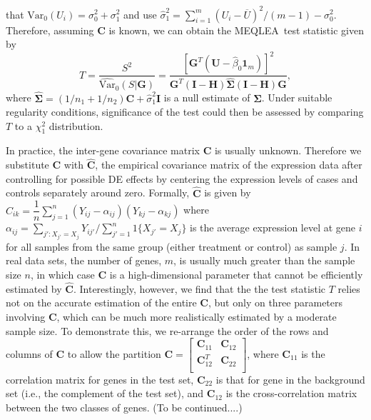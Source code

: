 \documentclass[a4,center,fleqn]{NAR}
\newcommand{\OurMethod}{MEQLEA}
\begin{document}
	that $\mbox{Var}_{0}(U_i)=\sigma_0^2+\sigma_1^2$ and use
	$\hat\sigma_1^2=\sum_{i=1}^m(U_i-\overline{U})^2/(m-1)-\sigma_0^2$. Therefore, assuming $\bm C$ is
	known, we can obtain the \OurMethod~test statistic given by
	\begin{equation}
	T = \dfrac{S^2}{\widehat{\mbox{Var}}_{0}(S|\bm G)} = \dfrac{[\bm G^T(\bm U-\hat\beta_0\bm
		1_m)]^2}{\bm G^T(\bm I-\bm H)\hat{\bm\Sigma}(\bm I-\bm H)\bm G}, 
	\end{equation}
	where $\hat{\bm\Sigma}=(1/n_1+1/n_2)\bm C+\hat\sigma_1^2\bm I$ is a null estimate of $\bm \Sigma$.
	Under suitable regularity conditions, significance of the test could then be assessed by comparing
	$T$ to a $\chi^2_1$ distribution.
	
	In practice, the inter-gene covariance matrix $\bm C$ is usually unknown. Therefore we 
	substitute $\bm C$
	with $\hat {\bm C}$, the empirical covariance matrix of the expression data after controlling for
	possible DE effects by centering the expression levels of cases and controls separately around
	zero. Formally, $\hat {\bm C}$ is given by $\hat
	C_{ik}=\dfrac{1}{n}\sum_{j=1}^n(Y_{ij}-\alpha_{ij})(Y_{kj}-\alpha_{kj})$ where
	$\alpha_{ij}=\sum_{j':X_{j'}=X_{j}}Y_{ij'}/\sum_{j'=1}^n1\{X_{j'}=X_{j}\}$ is the average expression
	level at gene $i$ for all samples from the same group (either treatment or control) as sample $j$.
	In real data sets, the number of genes, $m$, is usually much greater than the sample size $n$, in
	which case $\bm C$ is a high-dimensional parameter that cannot be efficiently estimated by $\hat
	{\bm C}$. Interestingly, however, we find that the the test statistic $T$ relies not on
	the accurate estimation of the entire $\bm C$, but only on three parameters involving $\bm C$, which
	can be much more realistically estimated by a moderate sample size. To demonstrate this, we
	re-arrange the order of the rows and columns of $\bm C$ to allow the partition $\bm
	C=\left[\begin{array}{cc}
	\bm C_{11} & \bm C_{12} \\       \bm C_{12}^T & \bm C_{22} \\      \end{array}\right] $,
	where $\bm C_{11}$ is the correlation matrix for genes in the test set, $\bm C_{22}$ is that for
	gene in the background set (i.e., the complement of the test set), and $\bm C_{12}$ is the
	cross-correlation matrix between the two classes of genes. (To be continued....)
	
	
	
\end{document}
